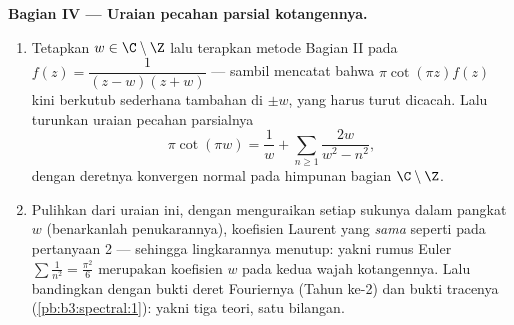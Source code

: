 \begin{problem}
\medskip
\noindent\textbf{Bagian IV --- Uraian pecahan parsial
kotangennya.}
\begin{enumerate}[resume]
  \item Tetapkan $w \in \C\setminus\Z$ lalu terapkan metode
        Bagian II pada $f(z) = \dfrac{1}{(z - w)(z + w)}$ ---
        sambil mencatat bahwa $\pi\cot(\pi z)f(z)$ kini berkutub
        sederhana tambahan di $\pm w$, yang  harus turut
        dicacah. Lalu turunkan uraian pecahan parsialnya
        \[
        \pi\cot(\pi w) = \frac1w +
        \sum_{n\geq1}\frac{2w}{w^2 - n^2},
        \]
        dengan deretnya konvergen normal pada himpunan bagian 
        $\C\setminus\Z$.
  \item Pulihkan dari uraian ini, dengan menguraikan setiap sukunya
        dalam pangkat $w$ (benarkanlah penukarannya), koefisien
        Laurent yang \emph{sama} seperti pada pertanyaan 2 ---
        sehingga lingkarannya menutup: yakni rumus Euler
        $\sum\frac1{n^2} = \frac{\pi^2}6$ merupakan koefisien
        $w$ pada kedua wajah kotangennya. Lalu bandingkan dengan
        bukti deret Fouriernya (Tahun ke-2) dan bukti tracenya
        (\cref{pb:b3:spectral:1}): yakni tiga teori, satu
        bilangan.
\end{enumerate}


\end{problem}
